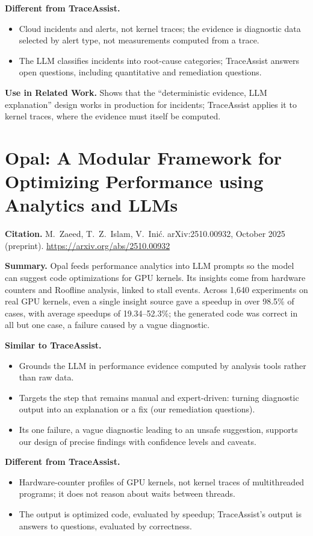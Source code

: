 \documentclass[11pt]{article}
\newcommand{\sysname}{TraceAssist\xspace}
\begin{document}
\textbf{Different from \sysname.}
\begin{itemize}
  \item Cloud incidents and alerts, not kernel traces; the evidence is
        diagnostic data selected by alert type, not measurements computed
        from a trace.
  \item The LLM classifies incidents into root-cause categories; \sysname
        answers open questions, including quantitative and remediation
        questions.
\end{itemize}

\textbf{Use in Related Work.} Shows that the ``deterministic evidence, LLM
explanation'' design works in production for incidents; \sysname applies it
to kernel traces, where the evidence must itself be computed.

\section{Opal: A Modular Framework for Optimizing Performance using
Analytics and LLMs}

\textbf{Citation.} M.~Zaeed, T.~Z.~Islam, V.~In\dj{}i\'c. arXiv:2510.00932,
October 2025 (preprint).
\url{https://arxiv.org/abs/2510.00932}

\textbf{Summary.} Opal feeds performance analytics into LLM prompts so the
model can suggest code optimizations for GPU kernels. Its insights come from
hardware counters and Roofline analysis, linked to stall events. Across
1{,}640 experiments on real GPU kernels, even a single insight source gave a
speedup in over 98.5\% of cases, with average speedups of 19.34--52.3\%; the
generated code was correct in all but one case, a failure caused by a vague
diagnostic.

\textbf{Similar to \sysname.}
\begin{itemize}
  \item Grounds the LLM in performance evidence computed by analysis tools
        rather than raw data.
  \item Targets the step that remains manual and expert-driven: turning
        diagnostic output into an explanation or a fix (our remediation
        questions).
  \item Its one failure, a vague diagnostic leading to an unsafe
        suggestion, supports our design of precise findings with confidence
        levels and caveats.
\end{itemize}

\textbf{Different from \sysname.}
\begin{itemize}
  \item Hardware-counter profiles of GPU kernels, not kernel traces of
        multithreaded programs; it does not reason about waits between
        threads.
  \item The output is optimized code, evaluated by speedup; \sysname's
        output is answers to questions, evaluated by correctness.
\end{itemize}
\end{document}
